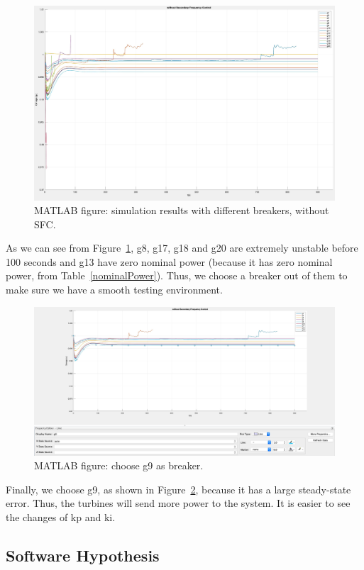 \begin{figure}[htbp]
\centering
\includegraphics[width = .891\textwidth]{figure/4_1_1_without1.jpeg}
\caption{MATLAB figure: simulation results with different breakers, without SFC.}
\label{4_1_1_without1}
\end{figure}

As we can see from Figure~\ref{4_1_1_without1}, g8, g17, g18 and g20 are extremely unstable before 100 seconds and g13 have zero nominal power (because it has zero nominal power, from Table~\ref{nominalPower}). Thus, we choose a breaker out of them to make sure we have a smooth testing environment. 


\begin{figure}[htbp]
\centering
\includegraphics[width = .891\textwidth]{figure/4_1_1_without2.jpeg}
\caption{MATLAB figure: choose g9 as breaker.}
\label{4_1_1_without2}
\end{figure}

Finally, we choose g9, as shown in Figure~\ref{4_1_1_without2}, because it has a large steady-state error. Thus, the turbines will send more power to the system. It is easier to see the changes of kp and ki. 

\subsection{Software Hypothesis} %


